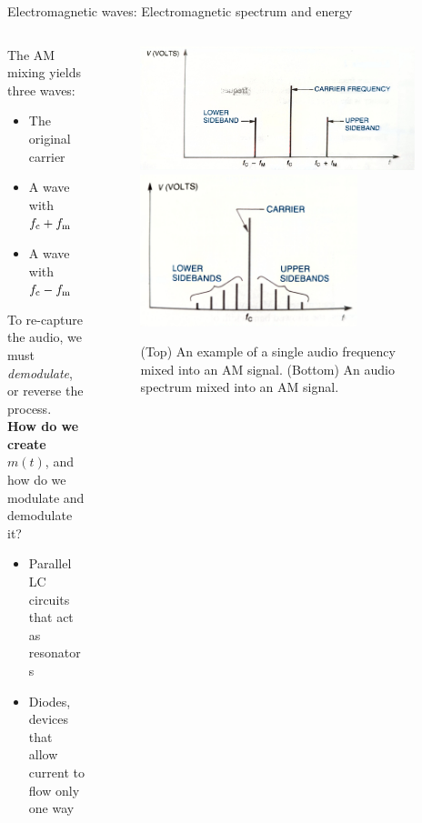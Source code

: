 \documentclass{beamer}
\begin{document}
\begin{frame}{Electromagnetic waves: Electromagnetic spectrum and energy}
\footnotesize
\begin{columns}[T]
\begin{column}{0.5\textwidth}
The AM mixing yields three waves:
\begin{itemize}
\item The original carrier
\item A wave with $f_{\rm c} + f_{\rm m}$
\item A wave with $f_{\rm c} - f_{\rm m}$
\end{itemize}
To re-capture the audio, we must \textit{demodulate}, or reverse the process.  \\ \vspace{0.5cm}\textbf{How do we create} $m(t)$, and how do we modulate and demodulate it?
\begin{itemize}
\item Parallel LC circuits that act as resonators
\item Diodes, devices that allow current to flow only one way
\end{itemize}
\end{column}
\begin{column}{0.5\textwidth}
\begin{figure}
\centering
\includegraphics[width=0.95\textwidth]{figures/AMSpec.pdf}
\includegraphics[width=0.75\textwidth]{figures/AMSpec2.pdf}
\caption{\label{fig:amspec} \footnotesize (Top) An example of a single audio frequency mixed into an AM signal. (Bottom) An audio spectrum mixed into an AM signal.}
\end{figure}
\end{column}
\end{columns}
\end{frame}
\end{document}
